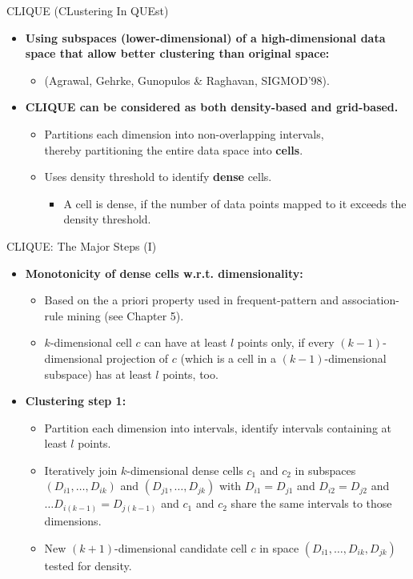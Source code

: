 \begin{frame}{CLIQUE (CLustering In QUEst)}
	\begin{itemize}
		\item \textbf{Using {\color{airforceblue}subspaces} (lower-dimensional) 
		of a high-dimensional data space that allow better clustering than 
		original space:}
		\begin{itemize}
			\item (Agrawal, Gehrke, Gunopulos \& Raghavan, SIGMOD'98).
		\end{itemize}
		\item \textbf{CLIQUE can be considered as both density-based and 
		grid-based.}
		\begin{itemize}
			\item Partitions each dimension into non-overlapping intervals, \\
			thereby partitioning the entire data space into \textbf{cells}.
			\item Uses density threshold to identify \textbf{dense} cells.
			\begin{itemize}
				\item A cell is dense, if the number of data points mapped to 
				it exceeds the density threshold.
			\end{itemize}
		\end{itemize}
	\end{itemize}
\end{frame}

\begin{frame}{CLIQUE: The Major Steps (I)}
	\begin{itemize}
		\item \textbf{Monotonicity of dense cells w.r.t. dimensionality:}
		\begin{itemize}
			\item Based on the a priori property used in frequent-pattern and 
			association-rule mining (see Chapter 5).
			\item $k$-dimensional cell $c$ can have at least $l$ points only, 
			if every $(k-1)$-dimensional projection of $c$ (which is a cell in 
			a $(k-1)$-dimensional subspace) has at least $l$ points, too.
		\end{itemize}
		\item \textbf{Clustering step 1:}
		\begin{itemize}
			\item Partition each dimension into intervals, identify intervals 
			containing at least $l$ points.
			\item Iteratively join $k$-dimensional dense cells $c_1$ and $c_2$ 
			in subspaces $(D_{i1}, \ldots, D_{ik})$ and $(D_{j1}, \ldots, 
			D_{jk})$ with $D_{i1} = D_{j1}$ and $D_{i2} = D_{j2}$ and $\ldots 
			D_{i(k-1)} = D_{j(k-1)}$ and $c_1$ and $c_2$ share the same 
			intervals to those dimensions.
			\item New $(k+1)$-dimensional candidate cell $c$ in space $(D_{i1}, 
			\ldots, D_{ik}, D_{jk})$ tested for density.
		\end{itemize}
	\end{itemize}
\end{frame}

